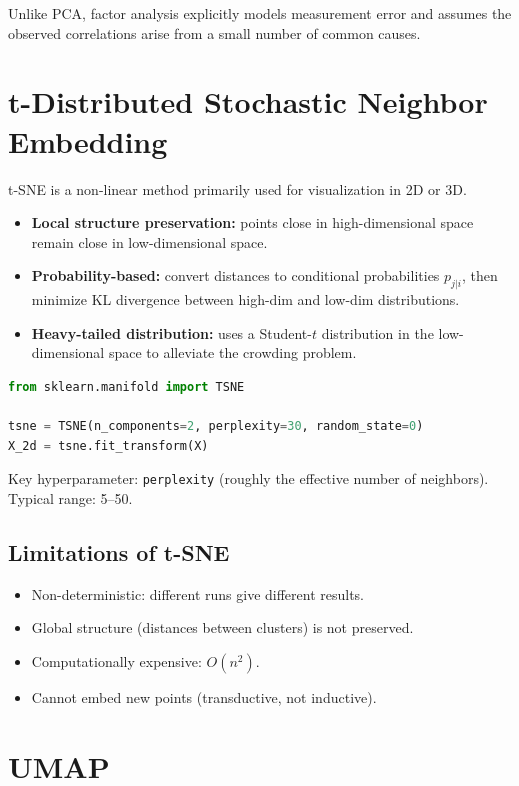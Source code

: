 Unlike PCA, factor analysis explicitly models measurement error and assumes the observed correlations arise from a small number of common causes.

\section{t-Distributed Stochastic Neighbor Embedding}

t-SNE is a non-linear method primarily used for visualization in 2D or 3D.

\begin{itemize}
	\item \textbf{Local structure preservation:} points close in high-dimensional space remain close in low-dimensional space.
	\item \textbf{Probability-based:} convert distances to conditional probabilities $p_{j|i}$, then minimize KL divergence between high-dim and low-dim distributions.
	\item \textbf{Heavy-tailed distribution:} uses a Student-$t$ distribution in the low-dimensional space to alleviate the crowding problem.
\end{itemize}

\begin{lstlisting}[language=Python, caption=t-SNE for visualization]
from sklearn.manifold import TSNE

tsne = TSNE(n_components=2, perplexity=30, random_state=0)
X_2d = tsne.fit_transform(X)
\end{lstlisting}

Key hyperparameter: \texttt{perplexity} (roughly the effective number of neighbors). Typical range: 5--50.

\subsection{Limitations of t-SNE}

\begin{itemize}
	\item Non-deterministic: different runs give different results.
	\item Global structure (distances between clusters) is not preserved.
	\item Computationally expensive: $O(n^2)$.
	\item Cannot embed new points (transductive, not inductive).
\end{itemize}

\section{UMAP}

